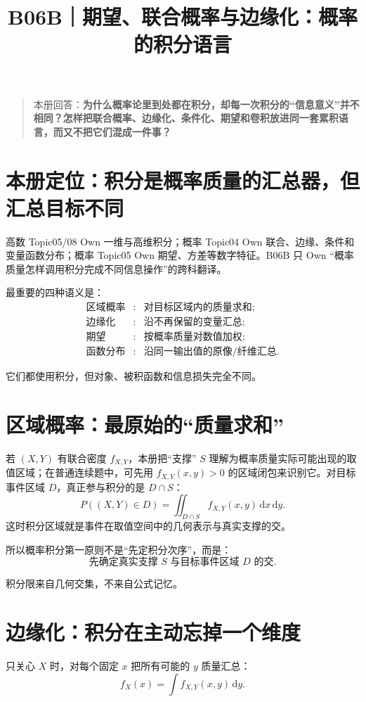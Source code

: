 \documentclass[profile=standard]{ipara-handbook}
\title{B06B｜期望、联合概率与边缘化：概率的积分语言}
\author{}
\date{}
\begin{document}
\maketitle

\begin{quote}
本册回答：\textbf{为什么概率论里到处都在积分，却每一次积分的“信息意义”并不相同？怎样把联合概率、边缘化、条件化、期望和卷积放进同一套累积语言，而又不把它们混成一件事？}
\end{quote}

\section{本册定位：积分是概率质量的汇总器，但汇总目标不同}
高数 Topic05/08 Own 一维与高维积分；概率 Topic04 Own 联合、边缘、条件和变量函数分布；概率 Topic05 Own 期望、方差等数字特征。B06B 只 Own “概率质量怎样调用积分完成不同信息操作”的跨科翻译。

最重要的四种语义是：
\[
\boxed{
\begin{array}{lll}
\text{区域概率} &:& \text{对目标区域内的质量求和};\\
\text{边缘化} &:& \text{沿不再保留的变量汇总};\\
\text{期望} &:& \text{按概率质量对数值加权};\\
\text{函数分布} &:& \text{沿同一输出值的原像/纤维汇总}. 
\end{array}}
\]

它们都使用积分，但对象、被积函数和信息损失完全不同。

\section{区域概率：最原始的“质量求和”}
若 $(X,Y)$ 有联合密度 $f_{X,Y}$，本册把“支撑” $S$ 理解为概率质量实际可能出现的取值区域；在普通连续题中，可先用 $f_{X,Y}(x,y)>0$ 的区域闭包来识别它。对目标事件区域 $D$，真正参与积分的是 $D\cap S$：
\[
P((X,Y)\in D)=\iint_{D\cap S} f_{X,Y}(x,y)\,\mathrm{d}x\,\mathrm{d}y.
\]
这时积分区域就是事件在取值空间中的几何表示与真实支撑的交。

所以概率积分第一原则不是“先定积分次序”，而是：
\[
\boxed{\text{先确定真实支撑 }S\text{ 与目标事件区域 }D\text{ 的交}.}
\]

积分限来自几何交集，不来自公式记忆。

\section{边缘化：积分在主动忘掉一个维度}
只关心 $X$ 时，对每个固定 $x$ 把所有可能的 $y$ 质量汇总：
\[
\boxed{f_X(x)=\int f_{X,Y}(x,y)\,\mathrm{d}y.}
\]
\end{document}
